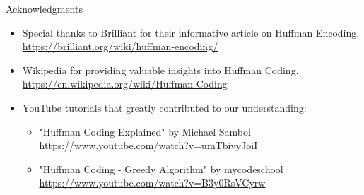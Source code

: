 \documentclass{beamer}
\begin{document}
\begin{frame}{Acknowledgments}
	\begin{itemize}
		\item Special thanks to Brilliant for their informative article on Huffman Encoding. \\
		\href{https://brilliant.org/wiki/huffman-encoding/}{https://brilliant.org/wiki/huffman-encoding/}
		
		\item Wikipedia for providing valuable insights into Huffman Coding. \\
		\href{https://en.wikipedia.org/wiki/Huffman_coding}{https://en.wikipedia.org/wiki/Huffman-Coding}
		
		\item YouTube tutorials that greatly contributed to our understanding:
		\begin{itemize}
			\item "Huffman Coding Explained" by Michael Sambol \\
			\href{https://www.youtube.com/watch?v=umTbivyJoiI}{https://www.youtube.com/watch?v=umTbivyJoiI}
			\item "Huffman Coding - Greedy Algorithm" by mycodeschool \\
			\href{https://www.youtube.com/watch?v=B3y0RsVCyrw}{https://www.youtube.com/watch?v=B3y0RsVCyrw}
		\end{itemize}
	\end{itemize}
\end{frame}


	
	
\end{document}
